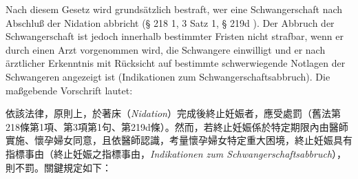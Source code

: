 \documentclass[12pt]{article}
\begin{document}
\begin{sourcepara}[title={原文理由 A.I.2} Rn 4]
Nach diesem Gesetz wird grundsätzlich bestraft, wer eine Schwangerschaft nach Abschluß der Nidation abbricht (§ 218 \abbrAbs{} 1, \abbrAbs{} 3 Satz 1, § 219d \abbrStGB{} \abbrAF{}). Der Abbruch der Schwangerschaft ist jedoch innerhalb bestimmter Fristen nicht strafbar, wenn er durch einen Arzt vorgenommen wird, die Schwangere einwilligt und er nach ärztlicher Erkenntnis mit Rücksicht auf bestimmte schwerwiegende Notlagen der Schwangeren angezeigt ist (Indikationen zum Schwangerschaftsabbruch). Die maßgebende Vorschrift lautet:
\end{sourcepara}
\begin{transpara}
依該法律，原則上，於著床（\textit{Nidation}）完成後終止妊娠者，應受處罰（舊法第218條第1項、第3項第1句、第219d條）。然而，若終止妊娠係於特定期限內由醫師實施、懷孕婦女同意，且依醫師認識，考量懷孕婦女特定重大困境，終止妊娠具有指標事由（終止妊娠之指標事由，\textit{Indikationen zum Schwangerschaftsabbruch}），則不罰。關鍵規定如下：
\end{transpara}
\end{document}
